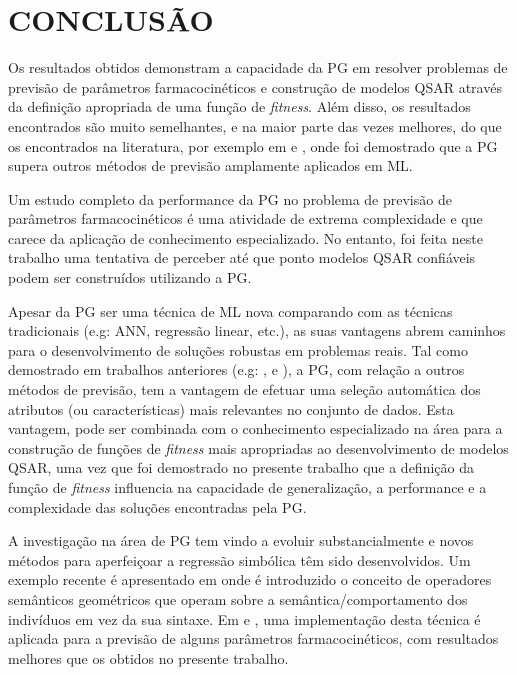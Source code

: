 \section{CONCLUSÃO}
\label{sec:9conclusao}

Os resultados obtidos demonstram a capacidade da \ac{PG} em resolver problemas de previsão de parâmetros farmacocinéticos e construção de
modelos \ac{QSAR} através da definição apropriada de uma função de \emph{fitness}. Além disso, os resultados encontrados 
são muito semelhantes, e na maior parte das vezes melhores, do que os encontrados na literatura, por exemplo em
\citep{Archetti2007,archetti2010genetic} e \citep{Archetti:2006}, onde foi demostrado que a \ac{PG} supera outros métodos de previsão
amplamente aplicados em \ac{ML}.

Um estudo completo da performance da \ac{PG} no problema de previsão de parâmetros farmacocinéticos é uma atividade de extrema complexidade
e que carece da aplicação de conhecimento especializado. No entanto, foi feita neste trabalho uma tentativa de perceber até que ponto
modelos \ac{QSAR} confiáveis podem ser construídos utilizando a PG.

Apesar da \ac{PG} ser uma técnica de \ac{ML} nova comparando com as técnicas tradicionais (e.g: 
\ac{ANN}, regressão linear, etc.), as suas vantagens abrem caminhos para o desenvolvimento de soluções robustas em 
problemas reais. Tal como demostrado em trabalhos anteriores (e.g: \citep{Archetti2007}, \citep{archetti2010genetic} e 
\citep{archetti2010genetic2}), a PG, com relação a outros métodos de previsão, tem a vantagem de efetuar uma seleção automática dos 
atributos (ou características) mais relevantes no conjunto de dados. Esta vantagem, pode ser combinada com o conhecimento 
especializado na área para a construção de funções de \emph{fitness} mais apropriadas ao desenvolvimento de modelos \ac{QSAR}, uma vez que 
foi demostrado no presente trabalho que a definição da função de \emph{fitness} influencia na capacidade de generalização, a performance
e a complexidade das soluções encontradas pela PG.

A investigação na área de \ac{PG} tem vindo a evoluir substancialmente e novos métodos para aperfeiçoar a regressão simbólica têm sido 
desenvolvidos. Um exemplo recente é apresentado em \citep{coello2012geometric} onde é introduzido o conceito de operadores semânticos 
geométricos que operam sobre a semântica/comportamento dos indivíduos em vez da sua sintaxe. Em \citep{vanneschi2013anewimplementation} e 
\citep{castelli2013geometricsemantic}, uma implementação desta técnica é aplicada para a previsão de alguns parâmetros farmacocinéticos,
com resultados melhores que os obtidos no presente trabalho.

